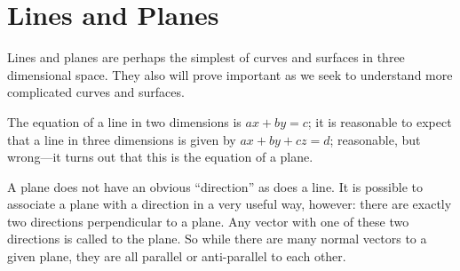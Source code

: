 \section{Lines and Planes}\label{sec:3Dlinesplanes}

Lines and planes are perhaps the simplest of curves and surfaces in
three dimensional space. They also will prove important as we seek to
understand more complicated curves and surfaces. 

The equation of a line in two dimensions is $ax+by=c$; it is
reasonable to expect that a line in three dimensions is
given by $ax + by +cz = d$; reasonable, but wrong---it turns out that
this is the equation of a plane.

A plane does not have an obvious ``direction'' as does a line. It is
possible to associate a plane with a direction in a very useful way,
however: there are exactly two directions perpendicular to a
plane. Any vector with one of these two directions is called  to the plane.
So while there are many normal vectors to a given plane, they are all
parallel or anti-parallel to each other.

